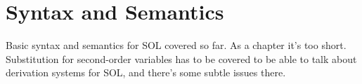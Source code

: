\documentclass[../../../include/open-logic-chapter]{subfiles}
\begin{document}
\chapter{Syntax and Semantics}

\begin{editorial}
Basic syntax and semantics for SOL covered so far. As a chapter it's
too short. Substitution for second-order variables has to be covered
to be able to talk about derivation systems for SOL, and there's some
subtle issues there.
\end{editorial}







\OLEndChapterHook
\end{document}
